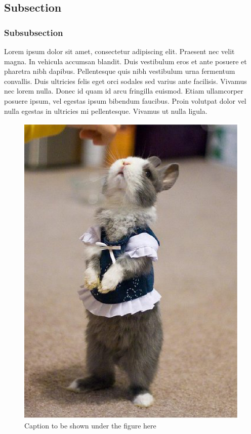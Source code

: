 
\subsection{Subsection}
\label{sec:fakesubsec}

\subsubsection*{Subsubsection}
Lorem ipsum dolor sit amet, consectetur adipiscing elit. Praesent nec velit magna. In vehicula accumsan blandit. Duis vestibulum eros et ante posuere et pharetra nibh dapibus. Pellentesque quis nibh vestibulum urna fermentum convallis. Duis ultricies felis eget orci sodales sed varius ante facilisis. Vivamus nec lorem nulla. Donec id quam id arcu fringilla euismod. Etiam ullamcorper posuere ipsum, vel egestas ipsum bibendum faucibus. Proin volutpat dolor vel nulla egestas in ultricies mi pellentesque. Vivamus ut nulla ligula.

\begin{figure}[!hbtp]
\centering
\includegraphics[height=\linewidth, angle=0]{chapter1/figures/bunny.ps}
\caption[Caption for `list of figures' page here]{Caption to be shown under the figure here}
\label{fig:fakefigure}
\end{figure}

